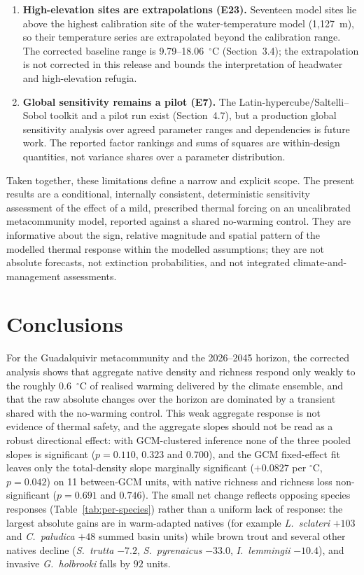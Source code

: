 \documentclass[11pt,a4paper]{article}
\begin{document}
\begin{enumerate}
    \item \textbf{High-elevation sites are extrapolations (E23).} Seventeen model sites lie above the highest calibration site of the water-temperature model (1,127~m), so their temperature series are extrapolated beyond the calibration range. The corrected baseline range is 9.79--18.06~$^\circ$C (Section~3.4); the extrapolation is not corrected in this release and bounds the interpretation of headwater and high-elevation refugia.
    \item \textbf{Global sensitivity remains a pilot (E7).} The Latin-hypercube/Saltelli--Sobol toolkit and a pilot run exist (Section~4.7), but a production global sensitivity analysis over agreed parameter ranges and dependencies is future work. The reported factor rankings and sums of squares are within-design quantities, not variance shares over a parameter distribution.
\end{enumerate}

Taken together, these limitations define a narrow and explicit scope. The present results are a conditional, internally consistent, deterministic sensitivity assessment of the effect of a mild, prescribed thermal forcing on an uncalibrated metacommunity model, reported against a shared no-warming control. They are informative about the sign, relative magnitude and spatial pattern of the modelled thermal response within the modelled assumptions; they are not absolute forecasts, not extinction probabilities, and not integrated climate-and-management assessments.

\section{Conclusions}

For the Guadalquivir metacommunity and the 2026--2045 horizon, the corrected analysis shows that aggregate native density and richness respond only weakly to the roughly 0.6~$^\circ$C of realised warming delivered by the climate ensemble, and that the raw absolute changes over the horizon are dominated by a transient shared with the no-warming control. This weak aggregate response is not evidence of thermal safety, and the aggregate slopes should not be read as a robust directional effect: with GCM-clustered inference none of the three pooled slopes is significant ($p=0.110$, $0.323$ and $0.700$), and the GCM fixed-effect fit leaves only the total-density slope marginally significant ($+0.0827$ per $^\circ$C, $p=0.042$) on 11 between-GCM units, with native richness and richness loss non-significant ($p=0.691$ and $0.746$). The small net change reflects opposing species responses (Table~\ref{tab:per-species}) rather than a uniform lack of response: the largest absolute gains are in warm-adapted natives (for example \textit{L.~sclateri} $+103$ and \textit{C.~paludica} $+48$ summed basin units) while brown trout and several other natives decline (\textit{S.~trutta} $-7.2$, \textit{S.~pyrenaicus} $-33.0$, \textit{I.~lemmingii} $-10.4$), and invasive \textit{G.~holbrooki} falls by $92$ units.
\end{document}
